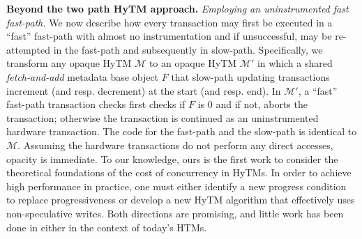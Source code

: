 \vspace{1mm}\noindent\textbf{Beyond the two path HyTM approach.}
\vspace{1mm}\noindent\textit{Employing an uninstrumented fast fast-path.}
We now describe how every transaction may first be executed in a ``fast'' fast-path with almost no instrumentation
and if unsuccessful, may be re-attempted in the fast-path and subsequently in slow-path.
Specifically, we transform any opaque HyTM $\mathcal{M}$ to an opaque
HyTM $\mathcal{M}'$ in which a shared \emph{fetch-and-add} metadata base object $F$ that slow-path updating transactions
increment (and resp. decrement) at the start (and resp. end). In $\mathcal{M}'$, a ``fast'' fast-path transaction checks first checks if $F$ is $0$
and if not, aborts the transaction; otherwise the transaction is continued as an uninstrumented hardware transaction.
The code for the fast-path and the slow-path is identical to $\mathcal{M}$.
Assuming the hardware transactions do not perform any direct accesses, opacity is immediate.
To our knowledge, ours is the first work to consider the theoretical foundations of the cost of concurrency in HyTMs.
In order to achieve high performance in practice, one must either identify a new progress condition to replace progressiveness or develop a new HyTM algorithm that effectively uses non-speculative writes.
Both directions are promising, and little work has been done in either in the context of today's HTMs.
